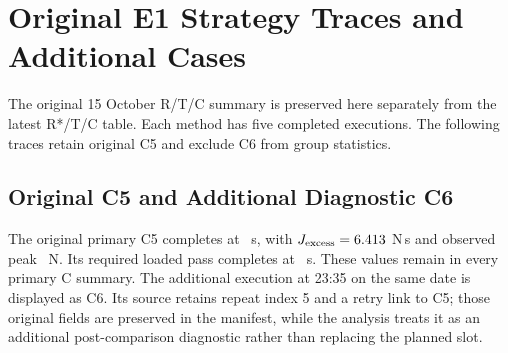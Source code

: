 \section{Original E1 Strategy Traces and Additional Cases}
\label{app:execution_cases}
The original 15 October R/T/C summary is preserved here separately from the latest R*/T/C table. Each method has five completed executions. The following traces retain original C5 and exclude C6 from group statistics.

\begin{table}[tbp]\centering\footnotesize
\caption[Original 15 October E1 comparison]{Original R/T/C comparison on 15 October 2026; mean \(\pm\) sample SD, \(n=5\). This table preserves the original cohort and is not pooled with additional \(R^{*}\).}
\label{tab:e1_original_comparison}
\end{table}


\subsection{Original C5 and Additional Diagnostic C6}
The original primary C5 completes at \CfiveTime~s, with \(J_{\mathrm{excess}}=6.413\) N\,s and observed peak \CfivePeak~N. Its required loaded pass completes at \CfivePass~s. These values remain in every primary C summary. The additional execution at 23:35 on the same date is displayed as C6. Its source retains repeat index 5 and a retry link to C5; those original fields are preserved in the manifest, while the analysis treats it as an additional post-comparison diagnostic rather than replacing the planned slot.

\begin{table}[tbp]\centering\footnotesize
\caption[Original C5 and additional diagnostic C6]{Individual E1 executions with the same recorded evaluator. C5 belongs to the original primary five; C6 is additional diagnostic evidence. Times are relative to each execution start. Single-run values are shown without mean or SD.}
\label{tab:e1_c5_c6}
\end{table}

